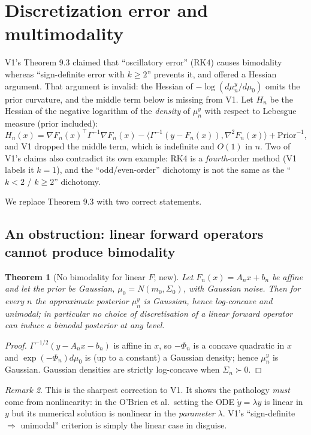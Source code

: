 \documentclass[11pt]{article}
\newtheorem{theorem}{Theorem}[section]
\theoremstyle{definition}
\theoremstyle{remark}
\newtheorem{remark}[theorem]{Remark}
\begin{document}
\section{Discretization error and multimodality}\label{sec:bimodal}
V1's Theorem 9.3 claimed that ``oscillatory error'' (RK4) causes bimodality whereas ``sign-definite
error with $k\ge2$'' prevents it, and offered a Hessian argument. That argument is invalid: the
Hessian of $-\log(d\mu^y_n/d\mu_0)$ omits the prior curvature, and the middle term below is missing
from V1. Let $H_n$ be the Hessian of the negative logarithm of the \emph{density} of $\mu^y_n$ with
respect to Lebesgue measure (prior included):
\begin{equation}\label{eq:hess}
  H_n(x)=\nabla F_n(x)^\top\Gamma^{-1}\nabla F_n(x)
        -\bigl\langle\Gamma^{-1}(y-F_n(x)),\nabla^2F_n(x)\bigr\rangle
        +\text{Prior}^{-1},
\end{equation}
and V1 dropped the middle term, which is indefinite and $O(1)$ in $n$. Two of V1's claims also
contradict its own example: RK4 is a \emph{fourth}-order method (V1 labels it $k=1$), and the
``odd/even-order'' dichotomy is not the same as the ``$k<2$ / $k\ge2$'' dichotomy.

We replace Theorem 9.3 with two correct statements.

\subsection{An obstruction: linear forward operators cannot produce bimodality}\label{sec:lin}
\begin{theorem}[No bimodality for linear $F$; new]\label{thm:obstruction}
Let $F_n(x)=A_nx+b_n$ be affine and let the prior be Gaussian, $\mu_0=N(m_0,\Sigma_0)$, with
Gaussian noise. Then for every $n$ the approximate posterior $\mu_n^y$ is Gaussian, hence
log-concave and unimodal; in particular no choice of discretisation of a \emph{linear} forward
operator can induce a bimodal posterior at any level.
\end{theorem}
\begin{proof}
$\Gamma^{-1/2}(y-A_nx-b_n)$ is affine in $x$, so $-\Phi_n$ is a concave quadratic in $x$ and
$\exp(-\Phi_n)d\mu_0$ is (up to a constant) a Gaussian density; hence $\mu_n^y$ is Gaussian.
Gaussian densities are strictly log-concave when $\Sigma_n\succ0$.
\end{proof}
\begin{remark}
This is the sharpest correction to V1. It shows the pathology \emph{must} come from nonlinearity:
in the O'Brien et al.\ setting the ODE $\dot y=\lambda y$ is linear in $y$ but its numerical
solution is nonlinear in the \emph{parameter} $\lambda$. V1's ``sign-definite $\Rightarrow$ unimodal''
criterion is simply the linear case in disguise.
\end{remark}
\end{document}
